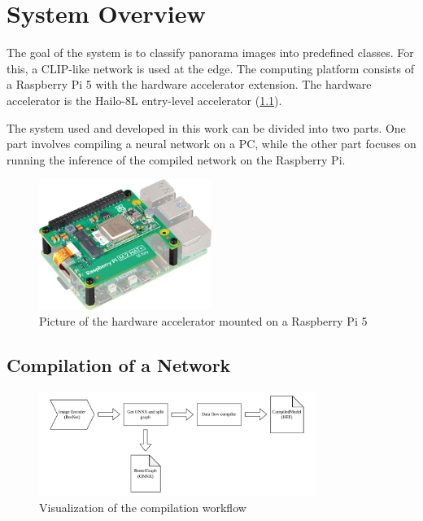 \chapter{System Overview}

The goal of the system is to classify panorama images into predefined classes.  
For this, a CLIP-like network is used at the edge.  
The computing platform consists of a Raspberry Pi 5 with the hardware accelerator extension.  
The hardware accelerator is the Hailo-8L entry-level accelerator (\cref{fig:overview:aikit}).  

The system used and developed in this work can be divided into two parts.  
One part involves compiling a neural network on a PC,  
while the other part focuses on running the inference of the compiled network on the Raspberry Pi.

\begin{figure}[h]
    \centering
    \includegraphics[width=0.5\textwidth]{Images/SystemOverview/ai-kit.png}
    \caption{Picture of the hardware accelerator mounted on a Raspberry Pi 5\cite{bildAiKit}}
    \label{fig:overview:aikit}
\end{figure}



\section{Compilation of a Network}

\begin{figure}
    \centering
    \includegraphics[width=0.8\textwidth]{Images/SystemOverview/DFCFlow.pdf}
    \caption{Visualization of the compilation workflow}
    \label{fig:overview:dfcflow}
\end{figure}

